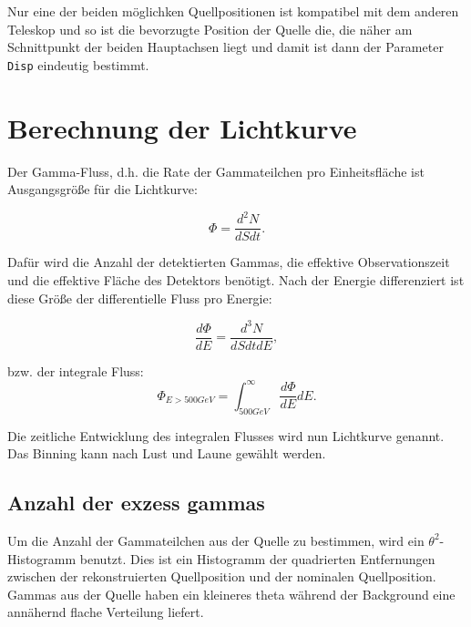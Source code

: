 Nur eine der beiden möglichken Quellpositionen ist kompatibel mit dem anderen Teleskop und so ist die bevorzugte Position der Quelle die, die näher am Schnittpunkt der beiden Hauptachsen liegt und damit ist dann der Parameter \texttt{Disp} eindeutig bestimmt.



\section{Berechnung der Lichtkurve}
Der Gamma-Fluss, d.h. die Rate der  Gammateilchen pro Einheitsfläche ist Ausgangsgröße für die Lichtkurve:

\begin{equation}
 \Phi=\frac{d^2 N}{dS dt}. 
\end{equation}

Dafür wird die Anzahl der detektierten Gammas, die effektive Observationszeit und die effektive Fläche des Detektors benötigt.
Nach der Energie differenziert ist diese Größe der differentielle Fluss pro Energie:

\begin{equation}
 \frac{d\Phi}{dE}=\frac{d^3N}{dSdtdE},
\end{equation}

bzw. der integrale Fluss:
\begin{equation}
 \Phi_{E>500GeV}=\int_{500GeV}^{\infty}\frac{d\Phi}{dE}dE.
\end{equation}


Die zeitliche Entwicklung des integralen Flusses wird nun Lichtkurve genannt.
Das Binning kann nach Lust und Laune gewählt werden.

\subsection{Anzahl der exzess gammas}
Um die Anzahl der Gammateilchen aus der Quelle zu bestimmen, wird ein $\theta^2$-Histogramm benutzt.
Dies ist ein Histogramm der quadrierten Entfernungen zwischen der rekonstruierten Quellposition und der nominalen Quellposition.
Gammas aus der Quelle haben ein kleineres theta während der Background eine annähernd flache Verteilung liefert. 

